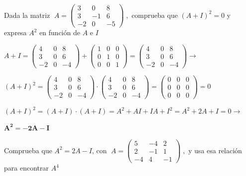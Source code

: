 \begin{ejre}
	Dada la matriz $\; A=\left( \begin{matrix} 3&0&8\\3&-1&6\\-2&0&-5  \end{matrix}\right)\; ,$  comprueba que $(A+I)^2=0$ y expresa $A^2$ en función de $A$ e $I$
\end{ejre}

\begin{proofw}\renewcommand{\qedsymbol}{$\diamond$}
	$A+I=\left( \begin{matrix}  4&0&8\\3&0&6\\-2&0&-4 \end{matrix}\right)+\left( \begin{matrix}  1&0&0\\0&1&0\\0&0&1 \end{matrix}\right)=\left( \begin{matrix}  4&0&8\\3&0&6\\-2&0&-4 \end{matrix}\right) \to $
	
\noindent $(A+I)^2= \left( \begin{matrix}  4&0&8\\3&0&6\\-2&0&-4 \end{matrix}\right) \cdot \left( \begin{matrix}  4&0&8\\3&0&6\\-2&0&-4 \end{matrix}\right)=\left( \begin{matrix}  0&0&0\\0&0&0\\0&0&0 \end{matrix}\right)=0$

\noindent $(A+I)^2=(A+I)\cdot (A+I)=A^2+AI+IA+I^2 = A^2+2A+I=0 \to $

\noindent $\boldsymbol{ A^2=-2A-I }$
\end{proofw}


\begin{ejre}
	Comprueba que $A^2=2A-I$, con
	$\; A=\left( \begin{matrix} 5&-4&2\\2&-1&1\\-4&4&-1 \end{matrix}\right)\; ,$
	y usa esa relación para encontrar $A^4$
\end{ejre}

